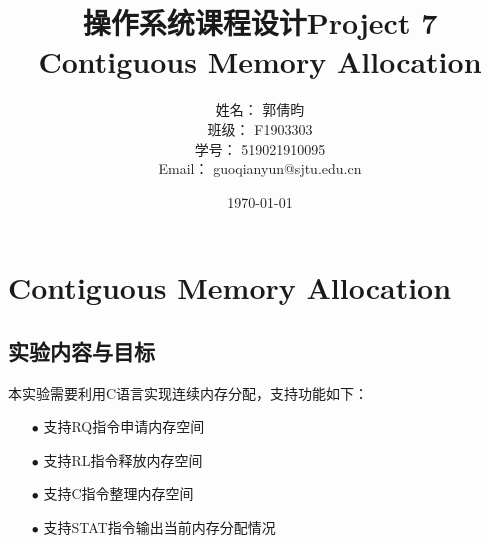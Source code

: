 \documentclass{article}
\title{\textbf{操作系统课程设计Project 7\\Contiguous Memory Allocation}} %
\author{姓名： 郭倩昀  
\\班级： F1903303  
\\学号： 519021910095  
\\Email： guoqianyun@sjtu.edu.cn} %
\date{\today} %
\begin{document}
\maketitle %
\tableofcontents
\newpage
\section{Contiguous Memory Allocation}
\subsection{实验内容与目标}
本实验需要利用C语言实现连续内存分配，支持功能如下：
\begin{itemize}
\item[$\bullet$]支持RQ指令申请内存空间
\item[$\bullet$]支持RL指令释放内存空间
\item[$\bullet$]支持C指令整理内存空间
\item[$\bullet$]支持STAT指令输出当前内存分配情况
\end{itemize}
\end{document}
